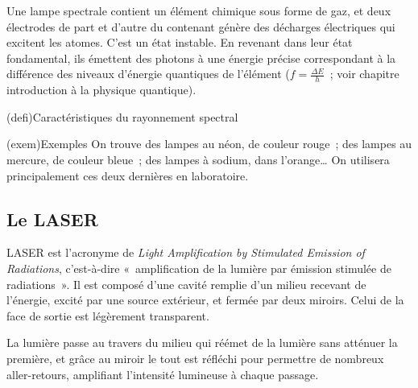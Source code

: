 \documentclass[../../main/main.tex]{subfiles}
\begin{document}
Une lampe spectrale contient un élément chimique sous forme de gaz, et deux
électrodes de part et d'autre du contenant génère des décharges électriques qui
excitent les atomes. C'est un état instable. En revenant dans leur état
fondamental, ils émettent des photons à une énergie précise correspondant à la
différence des niveaux d'énergie quantiques de l'élément ($f = \frac{\Delta
		E}{h}$~; voir chapitre introduction à la physique quantique).

\begin{tcb}(defi){Caractéristiques du rayonnement spectral}
\end{tcb}
\begin{tcb}[sidebyside, righthand width=.5\linewidth](exem){Exemples}
	On trouve des lampes au néon, de couleur rouge~; des lampes au mercure, de
	couleur bleue~; des lampes à sodium, dans l'orange… On utilisera
	principalement ces deux dernières en laboratoire.
	\tcblower
	\begin{center}
		\pgfspectra[element=Hg,
		axis, axis color=white, axis font color=black,
		axis ticks=4, axis unit precision=2,
		axis label text={Longueur d'onde [$\si{nm}$]},
		back=white,
		label, label position=north west,
		label before text=Spectre d'émission de~,
		label after text=\ :]
		\label{fig:lamp_spec}
	\end{center}
\end{tcb}

\subsection{Le LASER}
LASER est l'acronyme de \textit{Light Amplification by Stimulated Emission of
	Radiations}, c'est-à-dire «~amplification de la lumière par émission stimulée de
radiations~». Il est composé d'une cavité remplie d'un milieu recevant de
l'énergie, excité par une source extérieur, et fermée par deux miroirs. Celui de
la face de sortie est légèrement transparent.

La lumière passe au travers du milieu qui réémet de la lumière sans atténuer la
première, et grâce au miroir le tout est réfléchi pour permettre de nombreux
aller-retours, amplifiant l'intensité lumineuse à chaque passage.
\end{document}
